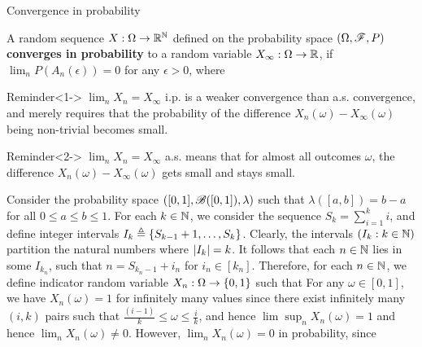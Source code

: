 \documentclass[12pt,aspectratio=169]{beamer}
\begin{document}
\begin{frame}{Convergence in probability}
\begin{Definition} 
A random sequence $X:\Omega\to\mathbb{R}^{\mathbb{N}}$ defined on the probability space $(\Omega, \mathscr{F}, P)$ \textbf{converges in probability} to a random variable $X_\infty:\Omega\to\mathbb{R}$, 
if $\lim_nP(A_n(\epsilon)) = 0$ for any $\epsilon > 0$, 
where 
\end{Definition}
\end{frame}

\begin{frame}
\begin{block}{Reminder}<1->
$\lim_nX_n = X_\infty$ i.p. is a weaker convergence than a.s. convergence, 
and merely requires that the probability of the difference $X_n(\omega)-X_\infty(\omega)$ being non-trivial becomes small. 
\end{block}
\begin{block}{Reminder}<2->
$\lim_nX_n = X_\infty$ a.s. means that for almost all outcomes $\omega$, 
the difference $X_n(\omega)-X_\infty(\omega)$ gets small and stays small. 
\end{block}
\end{frame}

\begin{frame}
\begin{Example} 
Consider the probability space $([0,1], \mathscr{B}([0,1]), \lambda)$ such that $\lambda([a,b]) = b-a$ for all $0 \le a \le b \le 1$. 
For each $k \in \mathbb{N}$, we consider the sequence $S_k = \sum_{i=1}^ki$, and define integer intervals $I_k \triangleq \left\{S_{k-1}+1, \dots, S_k\right\}$. 
Clearly, the intervals $(I_k:k \in \mathbb{N})$ partition the natural numbers where $\left\lvert I_k\right\rvert = k$. 
It follows that each $n \in \mathbb{N}$ lies in some $I_{k_n}$, such that $n = S_{k_n-1}+i_n$ for $i_n \in [k_n]$. 
Therefore, for each $n \in \mathbb{N}$, we define indicator random variable $X_n: \Omega \to \left\{0,1\right\}$ such that 
For any $\omega \in [0,1]$, we have $X_n(\omega) = 1$ for infinitely many values since there exist infinitely many $(i,k)$ pairs such that $\frac{(i-1)}{k} \le \omega \le \frac{i}{k}$, 
and hence $\lim\sup_nX_n(\omega) = 1$ and hence $\lim_nX_n(\omega) \neq 0$. 
However, $\lim_nX_n(\omega) = 0$ in probability, since 
\end{Example}
\end{frame}
\end{document}

